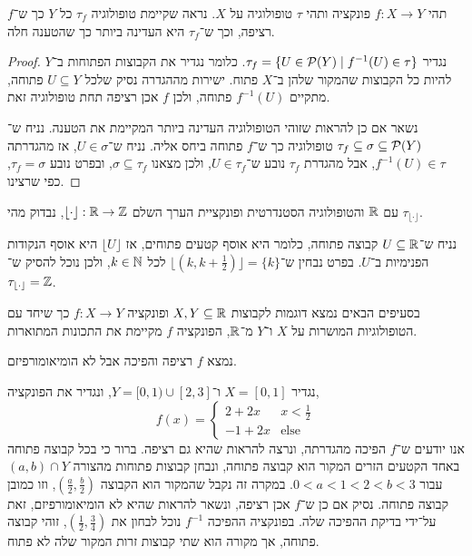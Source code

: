 \question{}
\subquestion{}
תהי $f : X \to Y$ פונקציה ותהי $\tau$ טופולוגיה על $X$.
נראה שקיימת טופולוגיה $\tau_f$ כל $Y$ כך ש־$f$ רציפה, וכך ש־$\tau_f$ היא העדינה ביותר כך שהטענה חלה.
\begin{proof}
	נגדיר $\tau_f = \{ U \in \mathcal{P}(Y) \mid f^{-1}(U) \in \tau \}$.
	כלומר נגדיר את הקבוצות הפתוחות ב־$Y$ להיות כל הקבוצות שהמקור שלהן ב־$X$ פתוח.
	ישירות מההגדרה נסיק שלכל $U \subseteq Y$ פתוחה, מתקיים $f^{-1}(U)$ פתוחה, ולכן $f$ אכן רציפה תחת טופולוגיה זאת.

	נשאר אם כן להראות שזוהי הטופולוגיה העדינה ביותר המקיימת את הטענה.
	נניח ש־$\tau_f \subseteq \sigma \subseteq \mathcal{P}(Y)$ טופולוגיה כך ש־$f$ פתוחה ביחס אליה.
	נניח ש־$U \in \sigma$, אז מהגדרתה $f^{-1}(U) \in \tau$, אבל מהגדרת $\tau_f$ נובע ש־$U \in \tau_f$, ולכן מצאנו $\sigma \subseteq \tau_f$, ובפרט נובע $\tau_f = \sigma$, כפי שרצינו.
\end{proof}

\subquestion{}
עם $\mathbb{R}$ והטופולוגיה הסטנדרטית ופונקציית הערך השלם $\lfloor \cdot \rfloor : \mathbb{R} \to \mathbb{Z}$, נבדוק מהי $\tau_{\lfloor \cdot \rfloor}$.
\begin{solution}
	נניח ש־$U \subseteq \mathbb{R}$ קבוצה פתוחה, כלומר היא אוסף קטעים פתוחים, אז $\lfloor U \rfloor$ היא אוסף הנקודות הפנימיות ב־$U$.
	בפרט נבחין ש־$\lfloor (k, k + \frac{1}{2}) \rfloor = \{ k \}$ לכל $k \in \mathbb{N}$, ולכן נוכל להסיק ש־$\tau_{\lfloor \cdot \rfloor} = \mathbb{Z}$.
\end{solution}

\question{}
בסעיפים הבאים נמצא דוגמות לקבוצות $X, Y \subseteq \mathbb{R}$ ופונקציה $f : X \to Y$ כך שיחד עם הטופולוגיות המושרות על $X$ ו־$Y$ מ־$\mathbb{R}$, הפונקציה $f$ מקיימת את התכונות המתוארות.

\subquestion{}
נמצא $f$ רציפה והפיכה אבל לא הומיאומורפיזם.
\begin{solution}
	נגדיר $X = [0, 1]$ ו־$Y = [0, 1) \cup [2, 3]$, ונגדיר את הפונקציה,
	\[
		f(x) = \begin{cases}
			2 + 2x & x < \frac{1}{2} \\
			-1 + 2x & \text{else}
		\end{cases}
	\]
	אנו יודעים ש־$f$ הפיכה מהגדרתה, ונרצה להראות שהיא גם רציפה.
	ברור כי בכל קבוצה פתוחה באחד הקטעים הזרים המקור הוא קבוצה פתוחה, ונבחן קבוצות פתוחות מהצורה $(a, b) \cap Y$ עבור $0 < a < 1 < 2 < b < 3$.
	במקרה זה נקבל שהמקור הוא הקבוצה $(\frac{a}{2}, \frac{b}{2})$, וזו כמובן קבוצה פתוחה.
	נסיק אם כן ש־$f$ אכן רציפה, ונשאר להראות שהיא לא הומיאומורפיזם, זאת על־ידי בדיקת ההפיכה שלה.
	בפונקציה ההפיכה $f^{-1}$ נוכל לבחון את $(\frac{1}{2}, \frac{3}{4})$, זוהי קבוצה פתוחה, אך מקורה הוא שתי קבוצות זרות המקור שלה לא פתוח.
\end{solution}

